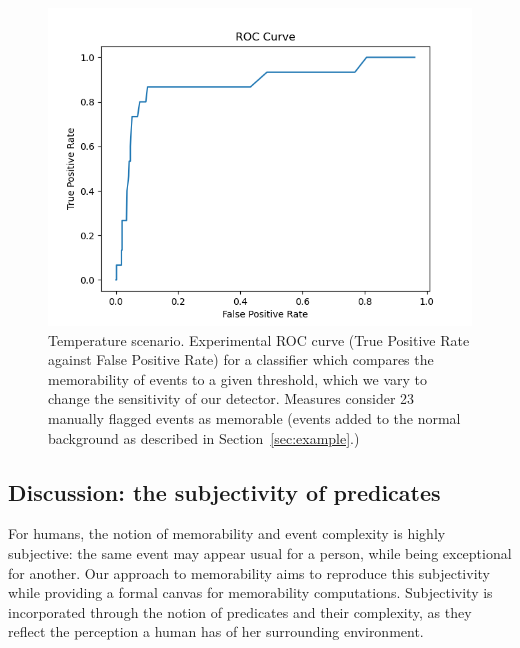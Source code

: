 \documentclass[entropy,article,submit,moreauthors,pdftex]{Definitions/mdpi}
\begin{document}
\begin{figure}[!ht]
    \centering
    \includegraphics[width=0.7\linewidth]{./figures/roc}
    \caption{Temperature scenario. Experimental ROC curve (True Positive Rate against False Positive
        Rate) for a classifier which compares the memorability of events to a given threshold, which we vary to change the sensitivity of our detector. Measures consider 23
        manually flagged events as memorable (events added to the normal background
        as described in Section~\ref{sec:example}.)}
    \label{fig:roc}
\end{figure}

\subsection{Discussion: the subjectivity of predicates}
\label{sec:discussion}
For humans, the notion of memorability and event complexity is highly subjective: the same event may appear usual for a person, while being exceptional for another. Our approach to memorability aims to reproduce this subjectivity while providing a formal canvas for memorability computations. Subjectivity is incorporated through the notion of predicates and their complexity, as they reflect the perception a human has of her surrounding environment.
\end{document}
